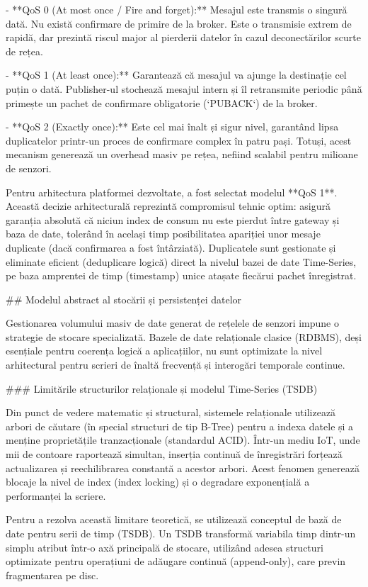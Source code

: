 - **QoS 0 (At most once / Fire and forget):** Mesajul este transmis o
  singură dată. Nu există confirmare de primire de la broker. Este o
  transmisie extrem de rapidă, dar prezintă riscul major al pierderii
  datelor în cazul deconectărilor scurte de rețea.

- **QoS 1 (At least once):** Garantează că mesajul va ajunge la
  destinație cel puțin o dată. Publisher-ul stochează mesajul intern și
  îl retransmite periodic până primește un pachet de confirmare
  obligatorie (`PUBACK`) de la broker.

- **QoS 2 (Exactly once):** Este cel mai înalt și sigur nivel, garantând
  lipsa duplicatelor printr-un proces de confirmare complex în patru
  pași. Totuși, acest mecanism generează un overhead masiv pe rețea,
  nefiind scalabil pentru milioane de senzori.

Pentru arhitectura platformei dezvoltate, a fost selectat modelul **QoS
1**. Această decizie arhitecturală reprezintă compromisul tehnic optim:
asigură garanția absolută că niciun index de consum nu este pierdut
între gateway și baza de date, tolerând în același timp posibilitatea
apariției unor mesaje duplicate (dacă confirmarea a fost întârziată).
Duplicatele sunt gestionate și eliminate eficient (deduplicare logică)
direct la nivelul bazei de date Time-Series, pe baza amprentei de timp
(timestamp) unice atașate fiecărui pachet înregistrat.

## Modelul abstract al stocării și persistenței datelor

Gestionarea volumului masiv de date generat de rețelele de senzori
impune o strategie de stocare specializată. Bazele de date relaționale
clasice (RDBMS), deși esențiale pentru coerența logică a aplicațiilor,
nu sunt optimizate la nivel arhitectural pentru scrieri de înaltă
frecvență și interogări temporale continue.

### Limitările structurilor relaționale și modelul Time-Series (TSDB)

Din punct de vedere matematic și structural, sistemele relaționale
utilizează arbori de căutare (în special structuri de tip B-Tree) pentru
a indexa datele și a menține proprietățile tranzacționale (standardul
ACID). Într-un mediu IoT, unde mii de contoare raportează simultan,
inserția continuă de înregistrări forțează actualizarea și
reechilibrarea constantă a acestor arbori. Acest fenomen generează
blocaje la nivel de index (index locking) și o degradare exponențială a
performanței la scriere.

Pentru a rezolva această limitare teoretică, se utilizează conceptul de
bază de date pentru serii de timp (TSDB). Un TSDB transformă variabila
timp dintr-un simplu atribut într-o axă principală de stocare, utilizând
adesea structuri optimizate pentru operațiuni de adăugare continuă
(append-only), care previn fragmentarea pe disc.

